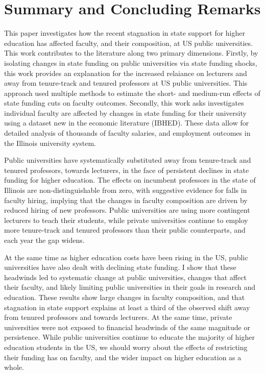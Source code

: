 \section{Summary and Concluding Remarks}
\label{sec:conclusion}

This paper investigates how the recent stagnation in state support for higher education has affected faculty, and their composition, at US public universities.
This work contributes to the literature along two primary dimensions.
Firstly, by isolating changes in state funding on public universities via state funding shocks, this work provides an explanation for the increased relaiance on lecturers and away from tenure-track and tenured professors at US public universities.
This approach used multiple methods to estimate the short- and medium-run effects of state funding cuts on faculty outcomes.
Secondly, this work asks investigates individual faculty are affected by changes in state funding for their university using a dataset new in the economic literature (IBHED).
These data allow for detailed analysis of thousands of faculty salaries, and employment outcomes in the Illinois university system.

Public universities have systematically substituted away from tenure-track and tenured professors, towards lecturers, in the face of persistent declines in state funding for higher education.
The effects on incumbent professors in the state of Illinois are non-distinguishable from zero, with suggestive evidence for falls in faculty hiring, implying that the changes in faculty composition are driven by reduced hiring of new professors.
Public universities are using more contingent lecturers to teach their students, while private universities continue to employ more tenure-track and tenured professors than their public counterparts, and each year the gap widens.

At the same time as higher education costs have been rising in the US, public universities have also dealt with declining state funding.
I show that these headwinds led to systematic change at public universities, changes that affect their faculty, and likely limiting public universities in their goals in research and education.
These results show large changes in faculty composition, and that stagnation in state support explains at least a third of the observed shift away from tenured professors and towards lecturers.
At the same time, private universities were not exposed to financial headwinds of the same magnitude or persistence.
While public universities continue to educate the majority of higher education students in the US, we should worry about the effects of restricting their funding has on faculty, and the wider impact on higher education as a whole.

